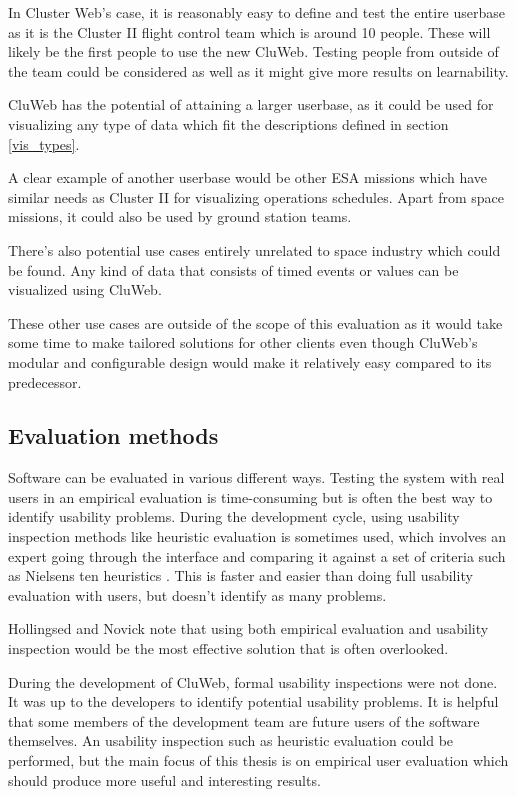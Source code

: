 In Cluster Web's case, it is reasonably easy to  define and test the entire userbase as it is the Cluster II flight control team which is around 10 people. These will likely be the  first people to use the new CluWeb. Testing people from outside of the team could be considered as well as it might give more results on learnability.

CluWeb has the potential of attaining a larger userbase, as it could be used for visualizing any type of data which fit the descriptions defined in section \ref{vis_types}. 

A clear example of another userbase would be other ESA missions which have similar needs as Cluster II for visualizing operations schedules. Apart from space missions, it could also be used by ground station teams.

There's also potential use cases entirely unrelated to space industry which could be found. Any kind of data that consists of timed events or values can be visualized using CluWeb.

These other use cases are outside of the scope of this evaluation as it would take some time to make tailored solutions for other clients even though CluWeb's modular and configurable design would make it relatively easy compared to its predecessor.

\cite{rubin2008handbook, albert2013measuring}

\subsection{Evaluation methods}
Software can be evaluated in various different ways. Testing the system with real users in an empirical evaluation is time-consuming but is often the best way to identify usability problems. During the development cycle, using usability inspection methods like heuristic evaluation is sometimes used, which involves an expert going through the interface and comparing it against a set of criteria such as Nielsens ten heuristics \cite{nielsen2005ten, nielsen1995usability}. This is faster and easier than doing full usability evaluation with users, but doesn't identify as many problems.

Hollingsed and Novick note that using both empirical evaluation and usability inspection would be the most effective solution that is often overlooked. \cite{hollingsed2007usability}

During the development of CluWeb, formal usability inspections were not done. It was up to the developers to identify potential usability problems. It is helpful that some members of the development team are future users of the software themselves. An usability inspection such as heuristic evaluation could be performed, but the main focus of this thesis is on empirical user evaluation which should produce more useful and interesting results.

